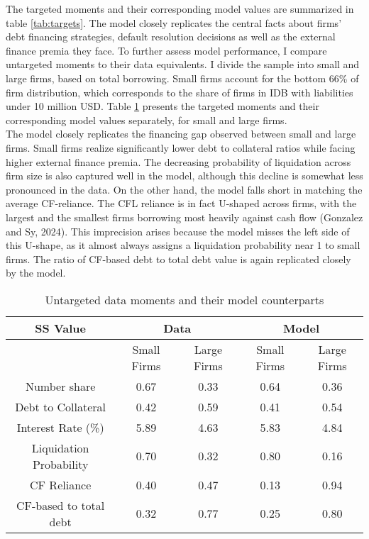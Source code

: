 \documentclass[12pt]{article}
\begin{document}
\noindent The targeted moments and their corresponding model values are summarized in table \ref{tab:targets}. The model closely replicates the central facts about firms' debt financing strategies, default resolution decisions as well as the external finance premia they face. To further assess model performance, I compare untargeted moments to their data equivalents. I divide the sample into small and large firms, based on total borrowing. Small firms account for the bottom 66\% of firm distribution, which corresponds to the share of firms in IDB with liabilities under 10 million USD. Table \ref{tab:untargeted} presents the targeted moments and their corresponding model values separately, for small and large firms.\vspace{3mm} \\
\noindent The model closely replicates the financing gap observed between small and large firms. Small firms realize significantly lower debt to collateral ratios while facing higher external finance premia. The decreasing probability of liquidation across firm size is also captured well in the model, although this decline is somewhat less pronounced in the data. On the other hand, the model falls short in matching the average CF-reliance. The CFL reliance is in fact U-shaped across firms, with the largest and the smallest firms borrowing most heavily against cash flow (Gonzalez and Sy, 2024). This imprecision arises because the model misses the left side of this U-shape, as it almost always assigns a liquidation probability near 1 to small firms. The ratio of CF-based debt to total debt value is again replicated closely by the model. 

\begin{table}[h!]
    \centering
    \begin{tabular}{c|c|c||c|c}
    \textbf{SS Value} &  \multicolumn{2}{c}{\textbf{Data}} & \multicolumn{2}{c}{\textbf{Model}} \\ 
    \toprule
     & Small Firms & Large Firms & Small Firms & Large Firms  \\ 
    \midrule
    Number share & 0.67 & 0.33 & 0.64 & 0.36 \\ 
    Debt to Collateral & 0.42 & 0.59 & 0.41 & 0.54 \\ 
    Interest Rate (\%) & 5.89 & 4.63 & 5.83 & 4.84 \\ 
    Liquidation Probability & 0.70 & 0.32 & 0.80 & 0.16 \\ 
    CF Reliance & 0.40 & 0.47 & 0.13 & 0.94 \\ 
    CF-based to total debt & 0.32 & 0.77 & 0.25 & 0.80 \\ 
    \bottomrule
    \end{tabular}
    \caption{Untargeted data moments and their model counterparts}
    \label{tab:untargeted}
\end{table}
\end{document}
